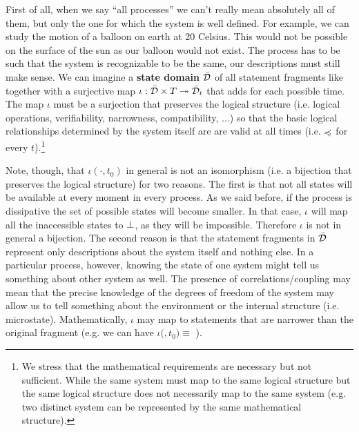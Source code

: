 \documentclass[letterpaper]{article}
\begin{document}
First of all, when we say ``all processes'' we can't really mean absolutely all of them, but only the one for which the system is well defined. For example, we can study the motion of a balloon on earth at 20 Celsius. This would not be possible on the surface of the sun as our balloon would not exist. The process has to be such that the system is recognizable to be the same, our descriptions must still make sense. We can imagine a \textbf{state domain} $\bar{\mathcal{D}}$ of all statement fragments like  together with a surjective map $\iota : \bar{\mathcal{D}} \times T \twoheadrightarrow \bar{\mathcal{D}}_t$ that adds  for each possible time. The map $\iota$ must be a surjection that preserves the logical structure (i.e. logical operations, verifiability, narrowness, compatibility, ...) so that the basic logical relationships determined by the system itself are are valid at all times (i.e.  $\preccurlyeq$  for every $t$).\footnote{We stress that the mathematical requirements are necessary but not sufficient. While the same system must map to the same logical structure but the same logical structure does not necessarily map to the same system (e.g. two distinct system can be represented by the same mathematical structure).}

Note, though, that $\iota( \cdot, t_0)$ in general is not an isomorphism (i.e. a bijection that preserves the logical structure) for two reasons. The first is that not all states will be available at every moment in every process. As we said before, if the process is dissipative the set of possible states will become smaller. In that case, $\iota$ will map all the inaccessible states to $\bot$, as they will be impossible. Therefore $\iota$ is not in general a bijection. The second reason is that the statement fragments in $\bar{\mathcal{D}}$ represent only descriptions about the system itself and nothing else. In a particular process, however, knowing the state of one system might tell us something about other system as well. The presence of correlations/coupling may mean that the precise knowledge of the degrees of freedom of the system may allow us to tell something about the environment or the internal structure (i.e. microstate). Mathematically, $\iota$ may map to statements that are narrower than the original fragment (e.g. we can have $\iota($$, t_0) \equiv$ ).
\end{document}
